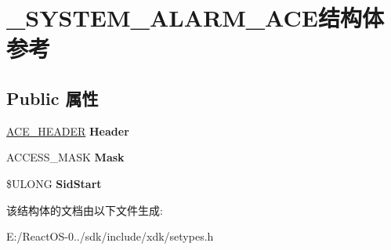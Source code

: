 \hypertarget{struct___s_y_s_t_e_m___a_l_a_r_m___a_c_e}{}\section{\+\_\+\+S\+Y\+S\+T\+E\+M\+\_\+\+A\+L\+A\+R\+M\+\_\+\+A\+C\+E结构体 参考}
\label{struct___s_y_s_t_e_m___a_l_a_r_m___a_c_e}
\subsection*{Public 属性}
\begin{DoxyCompactItemize}
\item 
\mbox{\label{struct___s_y_s_t_e_m___a_l_a_r_m___a_c_e_a5ee55bbed85f1f1a6f5b4dfb4d1adf7d}} 
\hyperlink{struct___a_c_e___h_e_a_d_e_r}{A\+C\+E\+\_\+\+H\+E\+A\+D\+ER} {\bfseries Header}
\item 
\mbox{\label{struct___s_y_s_t_e_m___a_l_a_r_m___a_c_e_a155850fdc9d4b51f4b745e322f7affef}} 
A\+C\+C\+E\+S\+S\+\_\+\+M\+A\+SK {\bfseries Mask}
\item 
\mbox{\label{struct___s_y_s_t_e_m___a_l_a_r_m___a_c_e_a855e3ca8b81ca19960f22ee84d54c3d2}} 
\$U\+L\+O\+NG {\bfseries Sid\+Start}
\end{DoxyCompactItemize}


该结构体的文档由以下文件生成\+:\begin{DoxyCompactItemize}
\item 
E\+:/\+React\+O\+S-\/0../sdk/include/xdk/setypes.\+h\end{DoxyCompactItemize}
